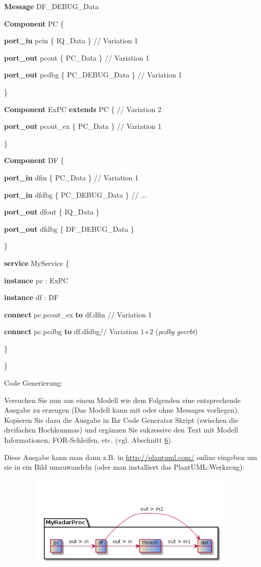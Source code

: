 \documentclass[a4]{article}
\begin{document}
\textbf{Message} DF\_DEBUG\_Data

\textbf{Component} PC \{

\textbf{port\_in} pcin \{ IQ\_Data \} // Variation 1

\textbf{port\_out} pcout \{ PC\_Data \} // Variation 1

\textbf{port\_out} pcdbg \{ PC\_DEBUG\_Data \} // Variation 1

\}

\textbf{Component} ExPC \textbf{extends} PC \{ // Variation 2

\textbf{port\_out} pcout\_ex \{ PC\_Data \} // Variation 1

\}

\textbf{Component} DF \{

\textbf{port\_in} dfin \{ PC\_Data \} // Variation 1

\textbf{port\_in} dfdbg \{ PC\_DEBUG\_Data \} // ...

\textbf{port\_out} dfout \{ IQ\_Data \}

\textbf{port\_out} dfdbg \{ DF\_DEBUG\_Data \}

\}

\textbf{service} MyService \{

\textbf{instance} pc : ExPC

\textbf{instance} df : DF

\textbf{connect} pc.pcout\_ex \textbf{to} df.dfin // Variation 1

\textbf{connect} pc.pcdbg \textbf{to} df.dfdbg// Variation 1+2
(\emph{pcdbg} \emph{geerbt})

\}

\}

Code Generierung:

Versuchen Sie nun aus einem Modell wie dem Folgenden eine entsprechende
Ausgabe zu erzeugen (Das Modell kann mit oder ohne Messages vorliegen).
Kopieren Sie dazu die Ausgabe in Ihr Code Generator Skript (zwischen die
dreifachen Hochkommas) und ergänzen Sie sukzessive den Text mit Modell
Informationen, FOR-Schleifen, etc. (vgl. Abschnitt
\protect\hyperlink{anchor-33}{6}).

Diese Ausgabe kann man dann z.B. in \url{http://plantuml.com/} online
eingeben um sie in ein Bild umzuwandeln (oder man installiert das
PlantUML-Werkzeug):

\includegraphics[width=5.19570in,height=1.71020in]{./Pictures/10000201000001EC000000D8D6389CC9995AC077.png}
\end{document}
